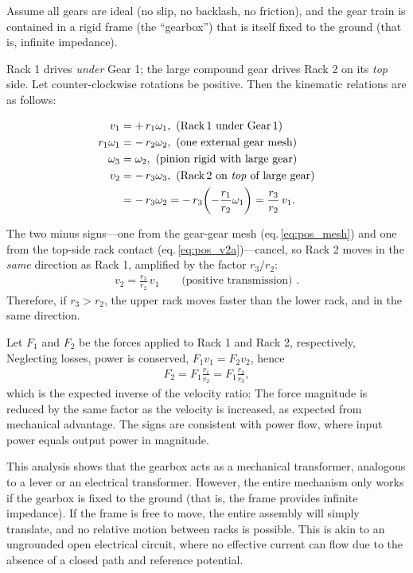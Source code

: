 \documentclass[reprint,aps,pra,superscriptaddress,longbibliography]{revtex4-2}
\begin{document}
Assume all gears are ideal (no slip, no backlash, no friction), and the gear train is contained in a rigid frame (the ``gearbox'') that is itself fixed to the ground (that is, infinite impedance).


Rack 1 drives \emph{under} Gear 1; the large compound gear drives
Rack 2 on its \emph{top} side.  Let counter-clockwise rotations be
positive.  Then the kinematic relations are as follows:

\begin{align}
v_1 &= +\,r_1 \omega_1 ,
       \text{ (Rack\,1 under Gear\,1)} \label{eq:pos_v1}\\
r_1 \omega_1 &= -\,r_2 \omega_2 ,
       \text{ (one external gear mesh)} \label{eq:pos_mesh}\\
\omega_3 &= \omega_2 ,
       \text{ (pinion rigid with large gear)} \label{eq:pos_rigid}\\
v_2 &= -\,r_3 \omega_3 ,
       \text{ (Rack\,2 on \emph{top} of large gear)} \label{eq:pos_v2a}\\
     &= -\,r_3 \omega_2= -\,r_3
        \!\left(-\frac{r_1}{r_2}\omega_1\right)
        =\frac{r_3}{r_2}\,v_1 .                \label{eq:pos_v2b}
\end{align}

The two minus signs---one from the gear-gear mesh
(eq.\,\ref{eq:pos_mesh}) and one from the top-side rack contact
(eq.\,\ref{eq:pos_v2a})---cancel, so Rack 2 moves in the \emph{same}
direction as Rack 1, amplified by the factor $r_3/r_2$:
\begin{align}
   v_2 = \frac{r_3}{r_2}\,v_1 \qquad \text{(positive transmission) }.
\end{align}
Therefore, if $r_3 > r_2$, the upper rack moves faster than the lower rack, and in the same direction.


Let $F_1$ and $F_2$ be the forces applied to Rack 1 and Rack 2, respectively,
Neglecting losses, power is conserved, $F_1 v_1 = F_2 v_2$, hence
\begin{align}
   F_2 = F_1 \frac{v_1}{v_2} = F_1 \frac{r_2}{r_3},
\end{align}
which is the expected inverse of the velocity ratio:
The force magnitude is reduced by the same factor as the velocity is increased, as expected from mechanical advantage.
The signs are consistent with power flow, where input power equals output power in magnitude.

This analysis shows that the gearbox acts as a mechanical transformer, analogous to a lever or an electrical transformer. However, the entire mechanism only works if the gearbox is fixed to the ground (that is, the frame provides infinite impedance). If the frame is free to move, the entire assembly will simply translate, and no relative motion between racks is possible. This is akin to an ungrounded open electrical circuit, where no effective current can flow due to the absence of a closed path and reference potential.
\end{document}

